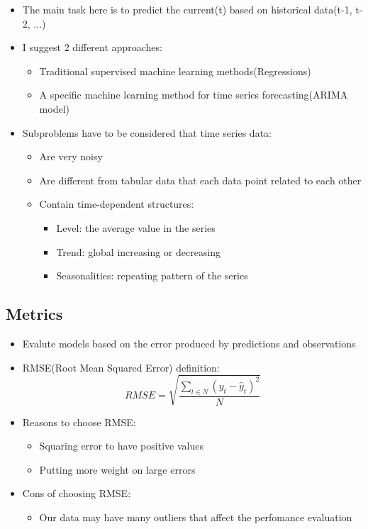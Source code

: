 \documentclass[11pt]{article}
\providecommand{\tightlist}{%
      \setlength{\itemsep}{0pt}\setlength{\parskip}{0pt}}
\begin{document}
\begin{itemize}
\tightlist
\item
  The main task here is to predict the current(t) based on historical
  data(t-1, t-2, ...)
\item
  I suggest 2 different approaches:

  \begin{itemize}
  \tightlist
  \item
    Traditional supervised machine learning methods(Regressions)
  \item
    A specific machine learning method for time series forecasting(ARIMA
    model)
  \end{itemize}
\item
  Subproblems have to be considered that time series data:

  \begin{itemize}
  \tightlist
  \item
    Are very noisy
  \item
    Are different from tabular data that each data point related to each
    other
  \item
    Contain time-dependent structures:

    \begin{itemize}
    \tightlist
    \item
      Level: the average value in the series
    \item
      Trend: global increasing or decreasing
    \item
      Seasonalities: repeating pattern of the series
    \end{itemize}
  \end{itemize}
\end{itemize}

\subsection{Metrics}\label{metrics}

\begin{itemize}
\tightlist
\item
  Evalute models based on the error produced by predictions and
  observations
\item
  RMSE(Root Mean Squared Error) definition:
  \[RMSE = \sqrt{\frac{\sum_{t \in N}(y_t - \hat{y}_t)^2}{N}}\]
\item
  Reasons to choose RMSE:

  \begin{itemize}
  \tightlist
  \item
    Squaring error to have positive values
  \item
    Putting more weight on large errors
  \end{itemize}
\item
  Cons of choosing RMSE:

  \begin{itemize}
  \tightlist
  \item
    Our data may have many outliers that affect the perfomance
    evaluation
  \end{itemize}
\end{itemize}
\end{document}

